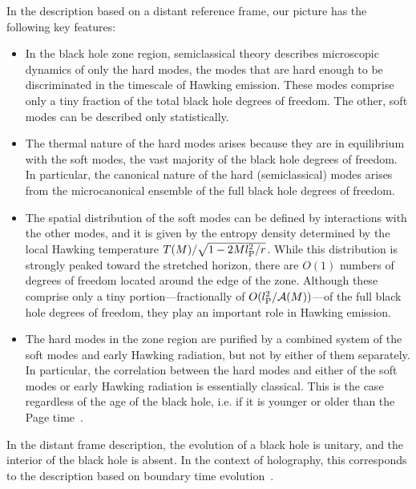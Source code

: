 \documentclass[12pt]{article}
\begin{document}
In the description based on a distant reference frame, our picture 
has the following key features:
%
\begin{itemize}
%
\item
In the black hole zone region, semiclassical theory describes 
microscopic dynamics of only the hard modes, the modes that 
are hard enough to be discriminated in the timescale of Hawking 
emission.  These modes comprise only a tiny fraction of the 
total black hole degrees of freedom.  The other, soft modes can 
be described only statistically.
%
\item
The thermal nature of the hard modes arises because they are in 
equilibrium with the soft modes, the vast majority of the black 
hole degrees of freedom.  In particular, the canonical nature 
of the hard (semiclassical) modes arises from the microcanonical 
ensemble of the full black hole degrees of freedom.
%
\item
The spatial distribution of the soft modes can be defined 
by interactions with the other modes, and it is given by the 
entropy density determined by the local Hawking temperature 
$T(M)/\sqrt{1-2Ml_{\rm P}^2/r}$.  While this distribution is 
strongly peaked toward the stretched horizon, there are $O(1)$ 
numbers of degrees of freedom located around the edge of the zone. 
Although these comprise only a tiny portion---fractionally of 
$O(l_{\rm P}^2/{\cal A}(M))$---of the full black hole degrees 
of freedom, they play an important role in Hawking emission.
%
\item
The hard modes in the zone region are purified by a combined system 
of the soft modes and early Hawking radiation, but not by either 
of them separately.  In particular, the correlation between the 
hard modes and either of the soft modes or early Hawking radiation 
is essentially classical.  This is the case regardless of the age 
of the black hole, i.e. if it is younger or older than the Page 
time~\cite{Page:1993wv}.
%
\end{itemize}
%
In the distant frame description, the evolution of a black hole is 
unitary, and the interior of the black hole is absent.  In the context 
of holography, this corresponds to the description based on boundary 
time evolution~\cite{Nomura:2018kji}.
\end{document}
